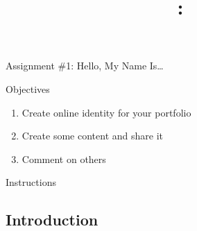 \documentclass[letterpaper]{article}
\title{\course{}: \activity{}}
\date{}
\newcommand{\activity}{Assignment \#1}
\newcommand{\horizrule}{\noindent\rule{\linewidth}{0.15mm}}
\begin{document}
\reversemarginpar

\begin{center}
  \Large{\activity{}: Hello, My Name Is\ldots}
\end{center}

\begin{center}
  \large{Objectives}

\begin{enumerate}
\item Create online identity for your portfolio
\item Create some content and share it
\item Comment on others
\end{enumerate}
\end{center}


\begin{center}
  \large{Instructions}
\end{center}


\subsection*{Introduction}
\end{document}
